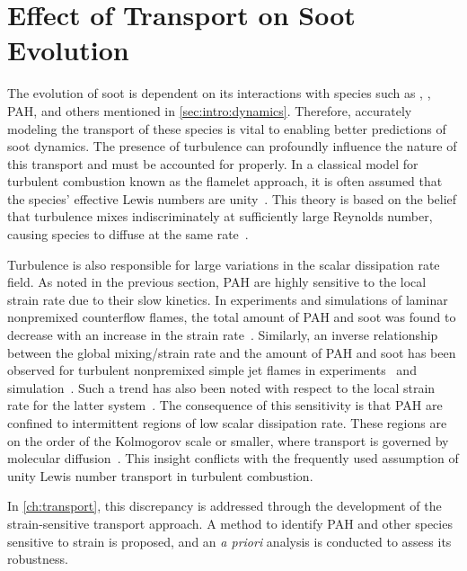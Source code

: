 \section{Effect of Transport on Soot Evolution}
\label{sec:intro:transport}

The evolution of soot is dependent on its interactions with species such as , , PAH, and others mentioned in \cref{sec:intro:dynamics}. Therefore, accurately modeling the transport of these species is vital to enabling better predictions of soot dynamics. The presence of turbulence can profoundly influence the nature of this transport and must be accounted for properly. In a classical model for turbulent combustion known as the flamelet approach, it is often assumed that the species' effective Lewis numbers are unity~\cite{peters1984}. This theory is based on the belief that turbulence mixes indiscriminately at sufficiently large Reynolds number, causing species to diffuse at the same rate~\cite{pitsch19981057}.

Turbulence is also responsible for large variations in the scalar dissipation rate field. As noted in the previous section, PAH are highly sensitive to the local strain rate due to their slow kinetics. In experiments and simulations of laminar nonpremixed counterflow flames, the total amount of PAH and soot was found to decrease with an increase in the strain rate~\cite{decroix2000,cuoci2009,huijnen2010,wang2016433}. Similarly, an inverse relationship between the global mixing/strain rate and the amount of PAH and soot has been observed for turbulent nonpremixed simple jet flames in experiments~\cite{kent1984,qamar2005,narayanaswamy2013,mahmoud2017} and simulation~\cite{attili2015}. Such a trend has also been noted with respect to the local strain rate for the latter system~\cite{bisetti2012,mueller2013,attili2014}. The consequence of this sensitivity is that PAH are confined to intermittent regions of low scalar dissipation rate. These regions are on the order of the Kolmogorov scale or smaller, where transport is governed by molecular diffusion~\cite{vaishnavi2008}. This insight conflicts with the frequently used assumption of unity Lewis number transport in turbulent combustion.

In \cref{ch:transport}, this discrepancy is addressed through the development of the strain-sensitive transport approach. A method to identify PAH and other species sensitive to strain is proposed, and an \textit{a priori} analysis is conducted to assess its robustness.


